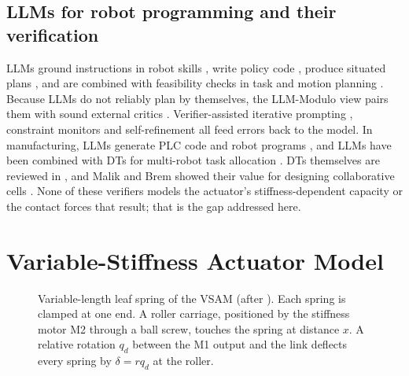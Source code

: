 \documentclass[journal]{IEEEtran}
\begin{document}
\subsection{LLMs for robot programming and their verification}
LLMs ground instructions in robot skills \cite{ahn2022}, write policy code \cite{liang2023,vemprala2023}, produce situated plans \cite{singh2023}, and are combined with feasibility checks in task and motion planning \cite{lin2023text2motion,chen2024autotamp}. Because LLMs do not reliably plan by themselves, the LLM-Modulo view pairs them with sound external critics \cite{kambhampati2024}. Verifier-assisted iterative prompting \cite{skreta2023}, constraint monitors \cite{yang2024safety} and self-refinement \cite{madaan2023} all feed errors back to the model. In manufacturing, LLMs generate PLC code \cite{yang2024autoplc} and robot programs \cite{antero2024,dong2025}, and LLMs have been combined with DTs for multi-robot task allocation \cite{deng2025}. DTs themselves are reviewed in \cite{tao2019}, and Malik and Brem showed their value for designing collaborative cells \cite{malik2021}. None of these verifiers models the actuator's stiffness-dependent capacity or the contact forces that result; that is the gap addressed here.

\section{Variable-Stiffness Actuator Model}\label{sec:vssea}
\begin{figure}[t]
\centering
{}
\caption{Variable-length leaf spring of the VSAM (after \cite{sariyildiz2023}). Each spring is clamped at one end. A roller carriage, positioned by the stiffness motor M2 through a ball screw, touches the spring at distance $x$. A relative rotation $q_d$ between the M1 output and the link deflects every spring by $\delta=r q_d$ at the roller.}
\label{fig:vsam}
\end{figure}
\end{document}
